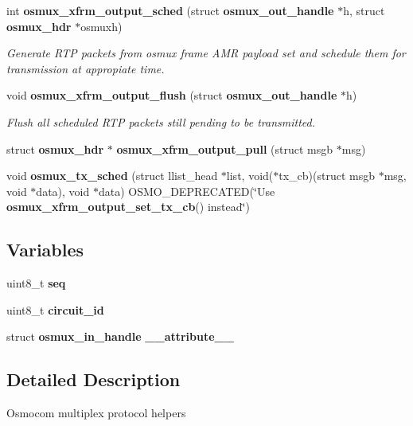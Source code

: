 \begin{DoxyCompactItemize}
\item 
int {\bf osmux\+\_\+xfrm\+\_\+output\+\_\+sched} (struct {\bf osmux\+\_\+out\+\_\+handle} $\ast$h, struct {\bf osmux\+\_\+hdr} $\ast$osmuxh)
\begin{DoxyCompactList}\small\item\em Generate R\+TP packets from osmux frame A\+MR payload set and schedule them for transmission at appropiate time. \end{DoxyCompactList}\item 
void {\bf osmux\+\_\+xfrm\+\_\+output\+\_\+flush} (struct {\bf osmux\+\_\+out\+\_\+handle} $\ast$h)
\begin{DoxyCompactList}\small\item\em Flush all scheduled R\+TP packets still pending to be transmitted. \end{DoxyCompactList}\item 
struct {\bf osmux\+\_\+hdr} $\ast$ {\bfseries osmux\+\_\+xfrm\+\_\+output\+\_\+pull} (struct msgb $\ast$msg)
\item 
void {\bfseries osmux\+\_\+tx\+\_\+sched} (struct llist\+\_\+head $\ast$list, void($\ast$tx\+\_\+cb)(struct msgb $\ast$msg, void $\ast$data), void $\ast$data) O\+S\+M\+O\+\_\+\+D\+E\+P\+R\+E\+C\+A\+T\+ED(\char`\"{}Use {\bf osmux\+\_\+xfrm\+\_\+output\+\_\+set\+\_\+tx\+\_\+cb}() instead\char`\"{})
\end{DoxyCompactItemize}
\subsection*{Variables}
\begin{DoxyCompactItemize}
\item 
uint8\+\_\+t {\bfseries seq}\label{osmux_8h_a3f47451edd2274525a52e40f4e26c399}

\item 
uint8\+\_\+t {\bfseries circuit\+\_\+id}\label{osmux_8h_a1bb0153eecb7f155fd9a8052df877a60}

\item 
struct {\bf osmux\+\_\+in\+\_\+handle} {\bfseries \+\_\+\+\_\+attribute\+\_\+\+\_\+}
\end{DoxyCompactItemize}


\subsection{Detailed Description}
Osmocom multiplex protocol helpers 